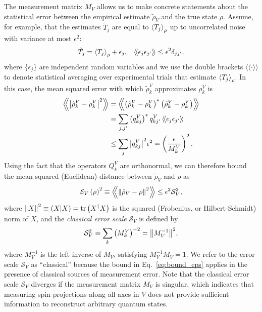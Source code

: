 \documentclass[nofootinbib,twocolumn]{revtex4-1}
\newcommand{\f}[2]{\dfrac{#1}{#2}} %
\newcommand{\p}[1]{\left(#1\right)} %
\newcommand{\bk}{\Braket} %
\renewcommand{\set}[1]{\{#1\}} %
\newcommand{\bbk}[1]{\langle\!\langle #1 \rangle\!\rangle}
\newcommand{\Bbk}[1]
{\left\langle\!\!\left\langle #1 \right\rangle\!\!\right\rangle}
\newcommand{\E}{\mathcal{E}}
\renewcommand{\S}{\mathcal{S}}
\def\obk#1{\mathinner{({#1})}}
\begin{document}
The measurement matrix $M_V$ allows us to make concrete statements about the statistical error between the empirical estimate $\tilde\rho_V$ and the true state $\rho$.
Assume, for example, that the estimates $\tilde T_j$ are equal to $\bk{T_j}_\rho$ up to uncorrelated noise with variance at most $\epsilon^2$:
\begin{align}
  \tilde T_j = \bk{T_j}_\rho + \epsilon_j,
  &&
  \bbk{\epsilon_j \epsilon_{j'}} \le \epsilon^2 \delta_{jj'},
  \label{eq:error_assumption}
\end{align}
where $\set{\epsilon_j}$ are independent random variables and we use the double brackets $\bbk{\cdot}$ to denote statistical averaging over experimental trials that estimate $\bk{T_j}_\rho$.
In this case, the mean squared error with which $\tilde\rho^V_k$ approximates $\rho^V_k$ is
\begin{align}
  \Bbk{\abs{\tilde\rho^V_k-\rho^V_k}^2}
  &= \Bbk{\p{\tilde\rho^V_k-\rho^V_k}^*\p{\tilde\rho^V_k-\rho^V_k}} \\
  &= \sum_{j,j'} \p{q^V_{kj}}^* q^V_{kj'} \,
  \bbk{\epsilon_j \epsilon_{j'}} \\
  &\le \sum_j \abs{q^V_{kj}}^2 \epsilon^2
  = \p{\f{\epsilon}{M^V_k}}^2.
\end{align}
Using the fact that the operators $Q^V_k$ are orthonormal, we can therefore bound the mean squared (Euclidean) distance between $\tilde\rho_V$ and $\rho$ as
\begin{align}
  \E_V\p{\rho}^2
  \equiv \Bbk{\norm{\tilde\rho_V-\rho}^2}
  \le \epsilon^2 \S_V^2,
  \label{eq:bound_eps}
\end{align}
where $\norm{X}^2 \equiv \obk{X|X} = \tr\p{X^\dag X}$ is the squared (Frobenius, or Hilbert-Schmidt) norm of $X$, and the {\it classical error scale} $\S_V$ is defined by
\begin{align}
  \S_V^2 \equiv \sum_k \p{M^V_k}^{-2} = \norm{M_V^{-1}}^2,
\end{align}
where $M_V^{-1}$ is the left inverse of $M_V$, satisfying $M_V^{-1} M_V = 1$.
We refer to the error scale $\S_V$ as ``classical'' because the bound in Eq.~\eqref{eq:bound_eps} applies in the presence of classical sources of measurement error.
Note that the classical error scale $\S_V$ diverges if the measurement matrix $M_V$ is singular, which indicates that measuring spin projections along all axes in $V$ does not provide sufficient information to reconstruct arbitrary quantum states.
\end{document}
